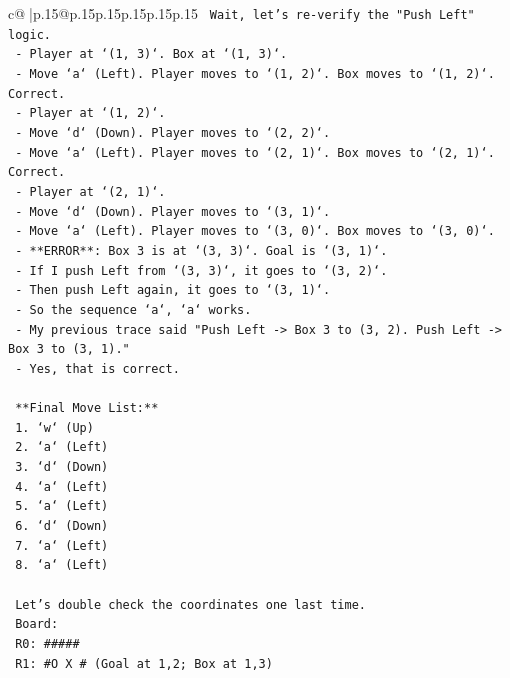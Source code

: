 \documentclass{article}
\begin{document}
{\begin{supertabular}{c@{$\;$}|p{.15\linewidth}@{}p{.15\linewidth}p{.15\linewidth}p{.15\linewidth}p{.15\linewidth}p{.15\linewidth}}
{{{\texttt{    Wait, let's re{-}verify the "Push Left" logic.} \\
\texttt{    {-} Player at `(1, 3)`. Box at `(1, 3)`.} \\
\texttt{    {-} Move `a` (Left). Player moves to `(1, 2)`. Box moves to `(1, 2)`. Correct.} \\
\texttt{    {-} Player at `(1, 2)`.} \\
\texttt{    {-} Move `d` (Down). Player moves to `(2, 2)`.} \\
\texttt{    {-} Move `a` (Left). Player moves to `(2, 1)`. Box moves to `(2, 1)`. Correct.} \\
\texttt{    {-} Player at `(2, 1)`.} \\
\texttt{    {-} Move `d` (Down). Player moves to `(3, 1)`.} \\
\texttt{    {-} Move `a` (Left). Player moves to `(3, 0)`. Box moves to `(3, 0)`.} \\
\texttt{    {-} **ERROR**: Box 3 is at `(3, 3)`. Goal is `(3, 1)`.} \\
\texttt{    {-} If I push Left from `(3, 3)`, it goes to `(3, 2)`.} \\
\texttt{    {-} Then push Left again, it goes to `(3, 1)`.} \\
\texttt{    {-} So the sequence `a`, `a` works.} \\
\texttt{    {-} My previous trace said "Push Left {-}> Box 3 to (3, 2). Push Left {-}> Box 3 to (3, 1)."} \\
\texttt{    {-} Yes, that is correct.} \\
\\ 
\texttt{    **Final Move List:**} \\
\texttt{    1. `w` (Up)} \\
\texttt{    2. `a` (Left)} \\
\texttt{    3. `d` (Down)} \\
\texttt{    4. `a` (Left)} \\
\texttt{    5. `a` (Left)} \\
\texttt{    6. `d` (Down)} \\
\texttt{    7. `a` (Left)} \\
\texttt{    8. `a` (Left)} \\
\\ 
\texttt{    Let's double check the coordinates one last time.} \\
\texttt{    Board:} \\
\texttt{    R0: \#\#\#\#\#} \\
\texttt{    R1: \#O X \#  (Goal at 1,2; Box at 1,3)} \\
}}}
\end{supertabular}}
\end{document}
